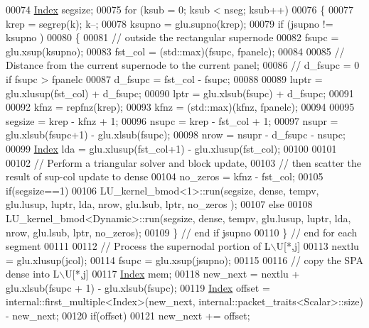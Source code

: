 \begin{DoxyCode}
00074   \hyperlink{namespace_eigen_a62e77e0933482dafde8fe197d9a2cfde}{Index} segsize; 
00075   \textcolor{keywordflow}{for} (ksub = 0; ksub < nseg; ksub++)
00076   \{
00077     krep = segrep(k); k--; 
00078     ksupno = glu.supno(krep); 
00079     \textcolor{keywordflow}{if} (jsupno != ksupno )
00080     \{
00081       \textcolor{comment}{// outside the rectangular supernode }
00082       fsupc = glu.xsup(ksupno); 
00083       fst\_col = (std::max)(fsupc, fpanelc); 
00084       
00085       \textcolor{comment}{// Distance from the current supernode to the current panel; }
00086       \textcolor{comment}{// d\_fsupc = 0 if fsupc > fpanelc}
00087       d\_fsupc = fst\_col - fsupc; 
00088       
00089       luptr = glu.xlusup(fst\_col) + d\_fsupc; 
00090       lptr = glu.xlsub(fsupc) + d\_fsupc; 
00091       
00092       kfnz = repfnz(krep); 
00093       kfnz = (std::max)(kfnz, fpanelc); 
00094       
00095       segsize = krep - kfnz + 1; 
00096       nsupc = krep - fst\_col + 1; 
00097       nsupr = glu.xlsub(fsupc+1) - glu.xlsub(fsupc); 
00098       nrow = nsupr - d\_fsupc - nsupc;
00099       \hyperlink{namespace_eigen_a62e77e0933482dafde8fe197d9a2cfde}{Index} lda = glu.xlusup(fst\_col+1) - glu.xlusup(fst\_col);
00100       
00101       
00102       \textcolor{comment}{// Perform a triangular solver and block update, }
00103       \textcolor{comment}{// then scatter the result of sup-col update to dense}
00104       no\_zeros = kfnz - fst\_col; 
00105       \textcolor{keywordflow}{if}(segsize==1)
00106         LU\_kernel\_bmod<1>::run(segsize, dense, tempv, glu.lusup, luptr, lda, nrow, glu.lsub, lptr, no\_zeros
      );
00107       \textcolor{keywordflow}{else}
00108         LU\_kernel\_bmod<Dynamic>::run(segsize, dense, tempv, glu.lusup, luptr, lda, nrow, glu.lsub, lptr, 
      no\_zeros);
00109     \} \textcolor{comment}{// end if jsupno }
00110   \} \textcolor{comment}{// end for each segment}
00111   
00112   \textcolor{comment}{// Process the supernodal portion of  L\(\backslash\)U[*,j]}
00113   nextlu = glu.xlusup(jcol); 
00114   fsupc = glu.xsup(jsupno);
00115   
00116   \textcolor{comment}{// copy the SPA dense into L\(\backslash\)U[*,j]}
00117   \hyperlink{namespace_eigen_a62e77e0933482dafde8fe197d9a2cfde}{Index} mem; 
00118   new\_next = nextlu + glu.xlsub(fsupc + 1) - glu.xlsub(fsupc); 
00119   \hyperlink{namespace_eigen_a62e77e0933482dafde8fe197d9a2cfde}{Index} offset = internal::first\_multiple<Index>(new\_next, internal::packet\_traits<Scalar>::size) - 
      new\_next;
00120   \textcolor{keywordflow}{if}(offset)
00121     new\_next += offset;

\end{DoxyCode}
